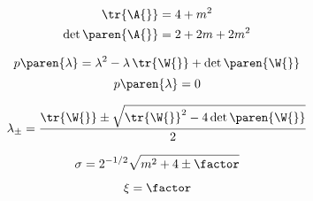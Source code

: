   \begin{equation*}   %
    \begin{split}
      \tr {\A{}} &= 4 + m^{2} \\
      \det \paren{\A{}} &= 2 + 2m + 2m^{2}
    \end{split}
  \end{equation*}

  \begin{equation*}   %
      p\paren{\lambda} = \lambda^{2} - \lambda \, \tr{\W{}} + \det\paren{\W{}}
  \end{equation*}
  \begin{equation*}   %
      p\paren{\lambda} = 0
  \end{equation*}

  \begin{equation*}   %
      \lambda_{\pm} = \frac{\tr{\W{}} \pm \sqrt{ \tr{\W{}}^{2} - 4 \det\paren{\W{}} } } {2}
  \end{equation*}


  \begin{equation*}   %
      \sigma = 2^{-1/2} \sqrt{m^{2} + 4 \pm \factor}
  \end{equation*}

  \begin{equation*}   %
      \xi = \factor
  \end{equation*}


